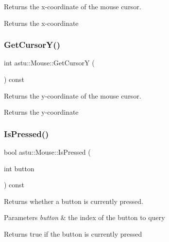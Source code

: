 Returns the x-\/coordinate of the mouse cursor.

\begin{DoxyReturn}{Returns}
the x-\/coordinate 
\end{DoxyReturn}
\mbox{\label{classastu_1_1Mouse_a8f008ad4c4a9cba165ff74e44b0bdb17}} 
\subsubsection{\texorpdfstring{Get\+Cursor\+Y()}{GetCursorY()}}
{\footnotesize\ttfamily int astu\+::\+Mouse\+::\+Get\+CursorY (\begin{DoxyParamCaption}{ }\end{DoxyParamCaption}) const}

Returns the y-\/coordinate of the mouse cursor.

\begin{DoxyReturn}{Returns}
the y-\/coordinate 
\end{DoxyReturn}
\mbox{\label{classastu_1_1Mouse_a400f6483be85ac0e4694806bdd22e25a}} 
\subsubsection{\texorpdfstring{Is\+Pressed()}{IsPressed()}}
{\footnotesize\ttfamily bool astu\+::\+Mouse\+::\+Is\+Pressed (\begin{DoxyParamCaption}\item[{int}]{button }\end{DoxyParamCaption}) const}

Returns whether a button is currently pressed.


\begin{DoxyParams}{Parameters}
{\em button} & the index of the button to query \\
\hline
\end{DoxyParams}
\begin{DoxyReturn}{Returns}
{\ttfamily true} if the button is currently pressed 
\end{DoxyReturn}
\mbox{\label{classastu_1_1Mouse_a1f60d23fe113d85a80569a5a3539eabf}} 
